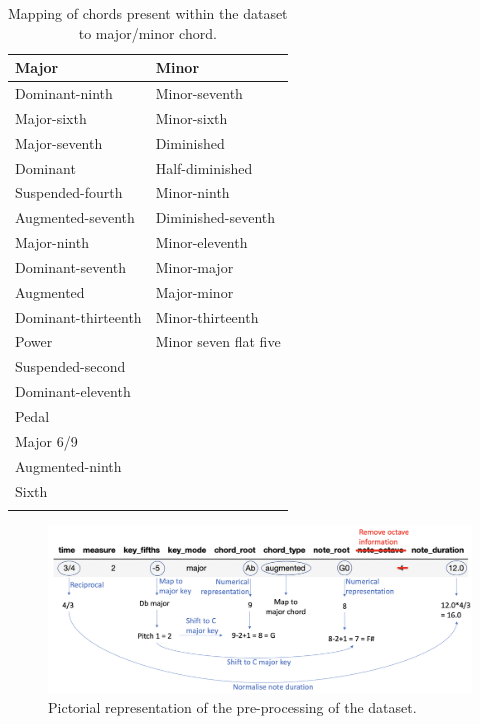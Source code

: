         \begin{table}
            \caption{Mapping of chords present within the dataset to major/minor chord.}
            \label{tab:chords}
            \centering
            \begin{tabular}{l l}
            \toprule
            Major & Minor \\
            \midrule
            Dominant-ninth & Minor-seventh\\
            Major-sixth & Minor-sixth\\
            Major-seventh & Diminished\\
            Dominant & Half-diminished\\
            Suspended-fourth & Minor-ninth\\
            Augmented-seventh & Diminished-seventh\\
            Major-ninth & Minor-eleventh\\
            Dominant-seventh & Minor-major\\
            Augmented & Major-minor\\
            Dominant-thirteenth & Minor-thirteenth\\
            Power & Minor seven flat five\\
            Suspended-second &  \\
            Dominant-eleventh &  \\
            Pedal &  \\
            Major 6/9 &  \\
            Augmented-ninth &  \\
            Sixth &  \\

            \bottomrule\\
            \end{tabular}
            \end{table}
            

        \begin{figure}
            \centering
            \includegraphics[scale=0.3]{Figures/Algorithm pictorial2}
            \decoRule
            \caption{Pictorial representation of the pre-processing of the dataset.
            }
            \label{fig:Alg1}
            \end{figure}
            
